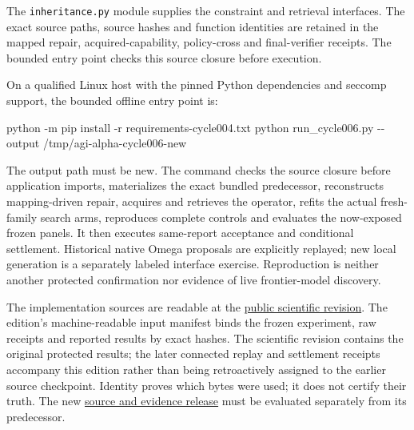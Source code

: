 \documentclass[
  10pt,
]{article}
\newenvironment{Shaded}{}{}
\newcommand{\AttributeTok}[1]{\textcolor[rgb]{0.49,0.56,0.16}{#1}}
\newcommand{\ExtensionTok}[1]{#1}
\newcommand{\NormalTok}[1]{#1}
\begin{document}
The \texttt{inheritance.py} module supplies the constraint and retrieval
interfaces. The exact source paths, source hashes and function
identities are retained in the mapped repair, acquired-capability,
policy-cross and final-verifier receipts. The bounded entry point checks
this source closure before execution.

On a qualified Linux host with the pinned Python dependencies and
seccomp support, the bounded offline entry point is:

\begin{Shaded}
\begin{Highlighting}[]
\ExtensionTok{python} \AttributeTok{{-}m}\NormalTok{ pip install }\AttributeTok{{-}r}\NormalTok{ requirements{-}cycle004.txt}
\ExtensionTok{python}\NormalTok{ run\_cycle006.py }\AttributeTok{{-}{-}output}\NormalTok{ /tmp/agi{-}alpha{-}cycle006{-}new}
\end{Highlighting}
\end{Shaded}

The output path must be new. The command checks the source closure
before application imports, materializes the exact bundled predecessor,
reconstructs mapping-driven repair, acquires and retrieves the operator,
refits the actual fresh-family search arms, reproduces complete controls
and evaluates the now-exposed frozen panels. It then executes
same-report acceptance and conditional settlement. Historical native
Omega proposals are explicitly replayed; new local generation is a
separately labeled interface exercise. Reproduction is neither another
protected confirmation nor evidence of live frontier-model discovery.

The implementation sources are readable at the
\href{https://github.com/MontrealAI/AGI-Alpha-Invention-Flywheel-Lab/tree/5f299ac4e0e937ee88f5e0bcddeef42dbc2e344c}{public
scientific revision}. The edition's machine-readable input manifest
binds the frozen experiment, raw receipts and reported results by exact
hashes. The scientific revision contains the original protected results;
the later connected replay and settlement receipts accompany this
edition rather than being retroactively assigned to the earlier source
checkpoint. Identity proves which bytes were used; it does not certify
their truth. The new
\href{https://github.com/MontrealAI/AGI-Alpha-Invention-Flywheel-Lab/releases/tag/perturbation-construction-20261029-r1}{source
and evidence release} must be evaluated separately from its predecessor.
\end{document}

